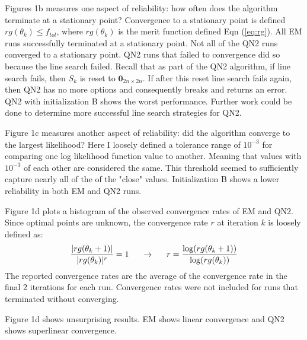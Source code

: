 \documentclass[letter,12pt]{article}
\begin{document}
Figures 1b measures one aspect of reliability: how often does the algorithm terminate at a stationary point?  Convergence to a stationary point is defined $rg(\theta_k) \leq f_{tol}$, where $rg(\theta_k)$ is the merit function defined Eqn (\ref{eq:rg}).  All EM runs successfully terminated at a stationary point.  Not all of the QN2 runs converged to a stationary point.  QN2 runs that failed to convergence did so because the line search failed.  Recall that as part of the QN2 algorithm, if line search fails, then $S_k$ is reset to $\boldsymbol{0}_{2n \times 2n}$.  If after this reset line search fails again, then QN2 has no more options and consequently breaks and returns an error.  QN2 with initialization B shows the worst performance.  Further work could be done to determine more successful line search strategies for QN2.

Figure 1c measures another aspect of reliability: did the algorithm converge to the largest likelihood?  Here I loosely defined a tolerance range of $10^{-3}$ for comparing one log likelihood function value to another.  Meaning that values with $10^{-3}$ of each other are considered the same.  This threshold seemed to sufficiently capture nearly all of the of the "close" values.  Initialization B shows a lower reliability in both EM and QN2 runs.

Figure 1d plots a histogram of the observed convergence rates of EM and QN2.  Since optimal points are unknown, the convergence rate $r$ at iteration $k$ is loosely defined as:
\[
\frac{|rg(\theta_k+1)|}{|rg(\theta_k)|^r} = 1
\indent
\rightarrow
\indent
r = \frac{\log(rg(\theta_k+1))}{\log(rg(\theta_k))}
\]
The reported convergence rates are the average of the convergence rate in the final 2 iterations for each run.  Convergence rates were not included for runs that terminated without converging.

Figure 1d shows unsurprising results.  EM shows linear convergence and QN2 shows superlinear convergence.




\pagebreak


\end{document}
